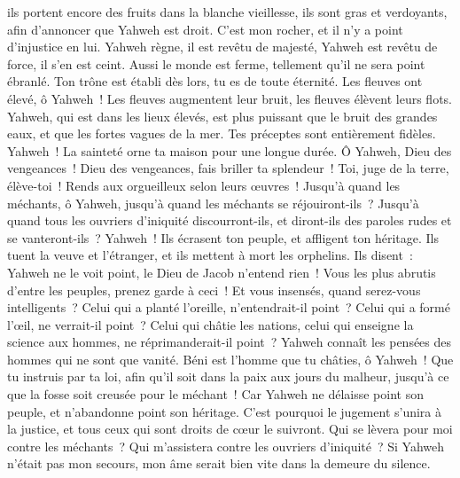 \begin{multicols}{2}
ils portent encore des fruits dans la blanche vieillesse, ils sont gras et verdoyants,
afin d'annoncer que Yahweh est droit. C'est mon rocher, et il n'y a point d'injustice en lui.
\VerseOne{}Yahweh règne, il est revêtu de majesté, Yahweh est revêtu de force, il s'en est ceint. Aussi le monde est ferme, tellement qu'il ne sera point ébranlé.
Ton trône est établi dès lors, tu es de toute éternité.
Les fleuves ont élevé, ô Yahweh~! Les fleuves augmentent leur bruit, les fleuves élèvent leurs flots.
Yahweh, qui est dans les lieux élevés, est plus puissant que le bruit des grandes eaux, et que les fortes vagues de la mer.
Tes préceptes sont entièrement fidèles. Yahweh~! La sainteté orne ta maison pour une longue durée.
\VerseOne{}Ô Yahweh, Dieu des vengeances~! Dieu des vengeances, fais briller ta splendeur~!
Toi, juge de la terre, élève-toi~! Rends aux orgueilleux selon leurs œuvres~!
Jusqu'à quand les méchants, ô Yahweh, jusqu'à quand les méchants se réjouiront-ils~?
Jusqu'à quand tous les ouvriers d'iniquité discourront-ils, et diront-ils des paroles rudes et se vanteront-ils~?
Yahweh~! Ils écrasent ton peuple, et affligent ton héritage.
Ils tuent la veuve et l'étranger, et ils mettent à mort les orphelins.
Ils disent~: Yahweh ne le voit point, le Dieu de Jacob n'entend rien~!
Vous les plus abrutis d'entre les peuples, prenez garde à ceci~! Et vous insensés, quand serez-vous intelligents~?
Celui qui a planté l'oreille, n'entendrait-il point~? Celui qui a formé l'œil, ne verrait-il point~?
Celui qui châtie les nations, celui qui enseigne la science aux hommes, ne réprimanderait-il point~?
Yahweh connaît les pensées des hommes qui ne sont que vanité.
Béni est l'homme que tu châties, ô Yahweh~! Que tu instruis par ta loi,
afin qu'il soit dans la paix aux jours du malheur, jusqu'à ce que la fosse soit creusée pour le méchant~!
Car Yahweh ne délaisse point son peuple, et n'abandonne point son héritage.
C'est pourquoi le jugement s'unira à la justice, et tous ceux qui sont droits de cœur le suivront.
Qui se lèvera pour moi contre les méchants~? Qui m'assistera contre les ouvriers d'iniquité~?
Si Yahweh n'était pas mon secours, mon âme serait bien vite dans la demeure du silence.

\end{multicols}
